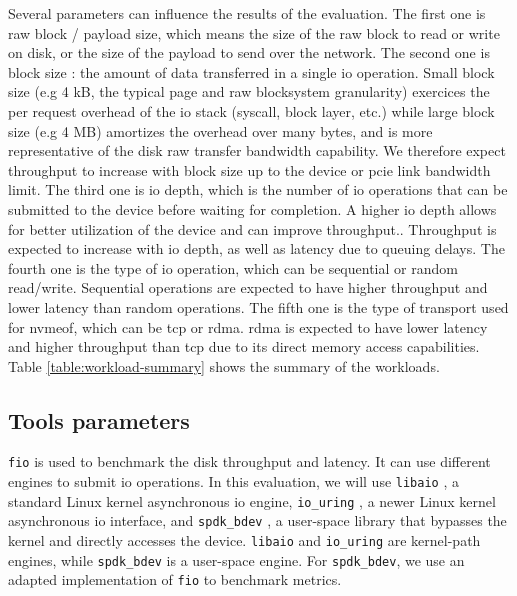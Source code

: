 Several parameters can influence the results of the evaluation. The first one is raw block / payload size, which means the size of the raw block to read or write on disk, or the size of the payload to send over the network. The second one is block size : the amount of data transferred in a single \acrshort{io} operation. Small block size (e.g 4 kB, the typical page and raw blocksystem granularity) exercices the per request overhead of the \acrshort{io} stack (syscall, block layer, etc.) while large block size (e.g 4 MB) amortizes the overhead over many bytes, and is more representative of the disk raw transfer bandwidth capability. We therefore expect throughput to increase with block size up to the device or \acrshort{pcie} link bandwidth limit. The third one is \acrshort{io} depth, which is the number of \acrshort{io} operations that can be submitted to the device before waiting for completion. A higher \acrshort{io} depth allows for better utilization of the device and can improve throughput.. Throughput is expected to increase with \acrshort{io} depth, as well as latency due to queuing delays. The fourth one is the type of \acrshort{io} operation, which can be sequential or random read/write. Sequential operations are expected to have higher throughput and lower latency than random operations. The fifth one is the type of transport used for \acrshort{nvmeof}, which can be \acrshort{tcp} or \acrshort{rdma}. \acrshort{rdma} is expected to have lower latency and higher throughput than \acrshort{tcp} due to its direct memory access capabilities. Table \ref{table:workload-summary} shows the summary of the workloads.

\subsection{Tools parameters}

\texttt{\acrshort{fio}} is used to benchmark the disk throughput and latency. It can use different engines to submit \acrshort{io} operations. In this evaluation, we will use \texttt{libaio} \cite{libaio}, a standard Linux kernel asynchronous \acrshort{io} engine, \texttt{io\_uring} \cite{io_uring_manpage,what_is_io_uring}, a newer Linux kernel asynchronous \acrshort{io} interface, and \texttt{spdk\_bdev} \cite{spdk_bdev_user_guide}, a user-space library that bypasses the kernel and directly accesses the device. \texttt{libaio} and \texttt{io\_uring} are kernel-path engines, while \texttt{spdk\_bdev} is a user-space engine. For \texttt{spdk\_bdev}, we use an adapted implementation of \texttt{\acrshort{fio}} \cite{spdk_fio_bdev_readme} to benchmark metrics. 


